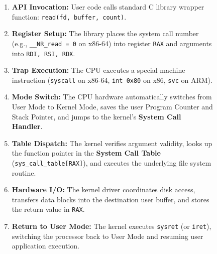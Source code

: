 \begin{figure}[htbp]
\centering
\begin{tcolorbox}[colback=codebg, colframe=primary, title=\textbf{Step-by-Step System Call Traversal: Reading a File (\texttt{read()})}]
\begin{enumerate}
    \item \textbf{API Invocation:} User code calls standard C library wrapper function: \texttt{read(fd, buffer, count)}.
    \item \textbf{Register Setup:} The library places the system call number (e.g., \texttt{\_\_NR\_read = 0} on x86-64) into register \texttt{RAX} and arguments into \texttt{RDI, RSI, RDX}.
    \item \textbf{Trap Execution:} The CPU executes a special machine instruction (\texttt{syscall} on x86-64, \texttt{int 0x80} on x86, \texttt{svc} on ARM).
    \item \textbf{Mode Switch:} The CPU hardware automatically switches from User Mode to Kernel Mode, saves the user Program Counter and Stack Pointer, and jumps to the kernel's \textbf{System Call Handler}.
    \item \textbf{Table Dispatch:} The kernel verifies argument validity, looks up the function pointer in the \textbf{System Call Table} (\texttt{sys\_call\_table[RAX]}), and executes the underlying file system routine.
    \item \textbf{Hardware I/O:} The kernel driver coordinates disk access, transfers data blocks into the destination user buffer, and stores the return value in \texttt{RAX}.
    \item \textbf{Return to User Mode:} The kernel executes \texttt{sysret} (or \texttt{iret}), switching the processor back to User Mode and resuming user application execution.
\end{enumerate}
\end{tcolorbox}
\end{figure}

